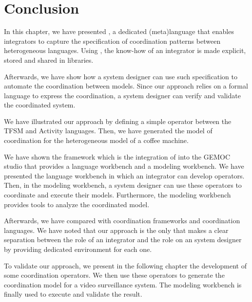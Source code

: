 \section{Conclusion}
In this chapter, we have presented \bcool, a dedicated (meta)language that enables integrators to capture the specification of coordination patterns between heterogeneous languages. Using \bcool, the know-how of an integrator is made explicit, stored and shared in libraries.

Afterwards, we have show how a system designer can use such specification to automate the coordination between models. Since our approach relies on a formal language to express the coordination, a system designer can verify and validate the coordinated system.  
	
We have illustrated our approach by defining a simple operator between the TFSM and Activity languages. Then, we have generated the model of coordination for the heterogeneous model of a coffee machine. 

We have shown the \bcool framework which is the integration of \bcool into the GEMOC studio that provides a language workbench and a modeling workbench. We have presented the language workbench in which an integrator can develop \bcool operators. Then, in the modeling workbench, a system designer can use these operators to coordinate and execute their models. Furthermore, the modeling workbench provides tools to analyze the coordinated model.  
	
Afterwards, we have compared \bcool with coordination frameworks and coordination languages. We have noted that our approach is the only that makes a clear separation between the role of an integrator and the role on an system designer by providing dedicated environment for each one.      

To validate our approach, we present in the following chapter the development of some \bcool coordination operators. We then use these operators to generate the coordination model for a video surveillance system. The modeling workbench is finally used to execute and validate the result.

